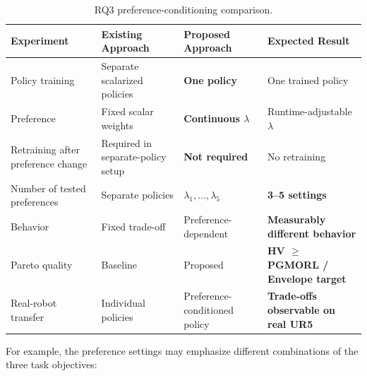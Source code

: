 \documentclass[journal]{IEEEtran}
\begin{document}
\begin{table}[t]
\centering
\caption{RQ3 preference-conditioning comparison.}
\label{tab:rq3}
\renewcommand{\arraystretch}{1.25}
\setlength{\tabcolsep}{4pt}

\footnotesize

\begin{tabular}{l l l l}
\toprule
\textbf{Experiment}
&
\textbf{Existing Approach}
&
\textbf{Proposed Approach}
&
\textbf{Expected Result}
\\
\midrule

Policy training
&
Separate scalarized policies
&
\textbf{One policy}
&
One trained policy
\\

Preference
&
Fixed scalar weights
&
\textbf{Continuous $\lambda$}
&
Runtime-adjustable $\lambda$
\\

Retraining after preference change
&
Required in separate-policy setup
&
\textbf{Not required}
&
No retraining
\\

Number of tested preferences
&
Separate policies
&
$\lambda_1,\ldots,\lambda_5$
&
\textbf{3--5 settings}
\\

Behavior
&
Fixed trade-off
&
Preference-dependent
&
\textbf{Measurably different behavior}
\\

Pareto quality
&
Baseline
&
Proposed
&
\textbf{HV $\geq$ PGMORL / Envelope target}
\\

Real-robot transfer
&
Individual policies
&
Preference-conditioned policy
&
\textbf{Trade-offs observable on real UR5}
\\

\bottomrule
\end{tabular}
\end{table}

For example, the preference settings may emphasize different
combinations of the three task objectives:
\end{document}
